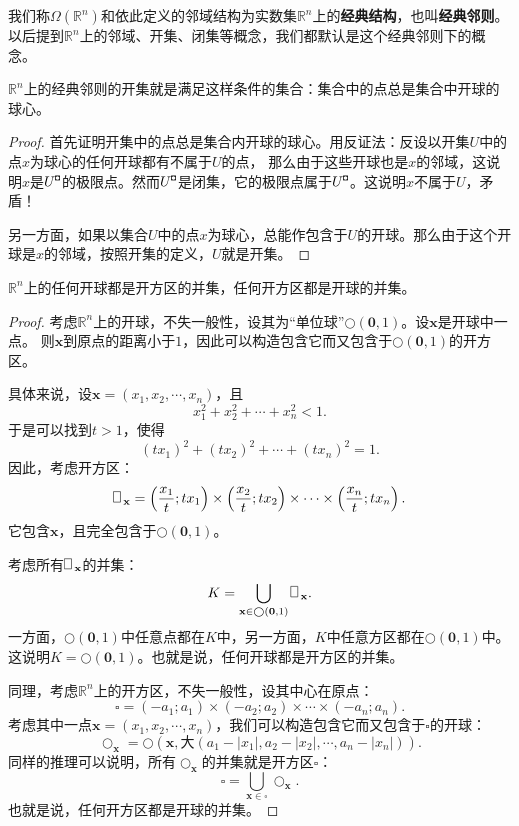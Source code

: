 \documentclass[12pt,UTF8,fontset=none]{ctexbook}
\begin{document}
\begin{appendix}
\begin{df}
    我们称$\Omega(\mathbb{R}^n)$和依此定义的邻域结构为实数集$\mathbb{R}^n$上的\textbf{经典结构}，也叫\textbf{经典邻则}。
    以后提到$\mathbb{R}^n$上的邻域、开集、闭集等概念，我们都默认是这个经典邻则下的概念。
\end{df}

\begin{tm}\label{tm:b-0-10}
    $\mathbb{R}^n$上的经典邻则的开集就是满足这样条件的集合：集合中的点总是集合中开球的球心。
\end{tm}

\begin{proof}
    首先证明开集中的点总是集合内开球的球心。用反证法：反设以开集$U$中的点$x$为球心的任何开球都有不属于$U$的点，
    那么由于这些开球也是$x$的邻域，这说明$x$是$U^{\bu}$的极限点。然而$U^{\bu}$是闭集，它的极限点属于$U^{\bu}$。这说明$x$不属于$U$，矛盾！

    另一方面，如果以集合$U$中的点$x$为球心，总能作包含于$U$的开球。那么由于这个开球是$x$的邻域，按照开集的定义，$U$就是开集。
\end{proof}

\begin{tm}\label{tm:b-1-30}
    $\mathbb{R}^n$上的任何开球都是开方区的并集，任何开方区都是开球的并集。
\end{tm}

\begin{proof}
    考虑$\mathbb{R}^n$上的开球，不失一般性，设其为“单位球”$\bigcirc(\mathbf{0}, 1)$。设$\mathbf{x}$是开球中一点。
    则$\mathbf{x}$到原点的距离小于$1$，因此可以构造包含它而又包含于$\bigcirc(\mathbf{0}, 1)$的开方区。

    具体来说，设$\mathbf{x} = (x_1, x_2, \cdots, x_n)$，且
    $$ x_1^2 + x_2^2 + \cdots + x_n^2 < 1.$$
    于是可以找到$t>1$，使得
    $$ (tx_1)^2 + (tx_2)^2 + \cdots + (tx_n)^2 = 1.$$
    因此，考虑开方区：
    $$ \rectbx_{\mathbf{x}} = \left(\frac{x_1}{t};tx_1\right)\times\left(\frac{x_2}{t};tx_2\right)\times\cdots\times\left(\frac{x_n}{t};tx_n\right).$$
    它包含$\mathbf{x}$，且完全包含于$\bigcirc(\mathbf{0}, 1)$。

    考虑所有$\rectbx_{\mathbf{x}}$的并集：
    $$ K = \bigcup_{\mathbf{x}\in \bigcirc(\mathbf{0}, 1)} \rectbx_{\mathbf{x}}. $$
    一方面，$\bigcirc(\mathbf{0}, 1)$中任意点都在$K$中，另一方面，$K$中任意方区都在$\bigcirc(\mathbf{0}, 1)$中。
    这说明$K = \bigcirc(\mathbf{0}, 1)$。也就是说，任何开球都是开方区的并集。

    同理，考虑$\mathbb{R}^n$上的开方区，不失一般性，设其中心在原点：
    $$ \square = (-a_1;a_1)\times(-a_2;a_2)\times\cdots\times(-a_n;a_n). $$
    考虑其中一点$\mathbf{x} = (x_1, x_2, \cdots, x_n)$，我们可以构造包含它而又包含于$\square$的开球：
    $$ \bigcirc_{\mathbf{x}} = \bigcirc(\mathbf{x}, \text{大}(a_1 - |x_1|, a_2 - |x_2|, \cdots, a_n - |x_n|)). $$
    同样的推理可以说明，所有$\bigcirc_{\mathbf{x}}$的并集就是开方区$\square$：
    $$ \square = \bigcup_{\mathbf{x}\in \square} \bigcirc_{\mathbf{x}}. $$
    也就是说，任何开方区都是开球的并集。


\end{proof}
\end{appendix}
\end{document}
